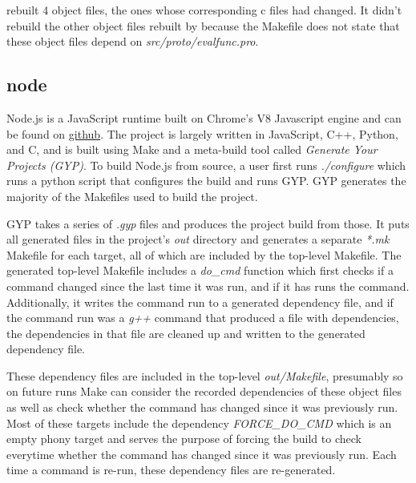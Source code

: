 \Make rebuilt 4 object files, the ones whose corresponding c files had changed.  It didn't rebuild the other object files rebuilt by \Rattle because the Makefile does not state that these object files
depend on \emph{src/proto/evalfunc.pro}.


\subsection{node}

Node.js is a JavaScript runtime built on Chrome's V8 Javascript engine and can be found on \href{``https://github.com/nodejs/node''}{github}.  The project is largely written in JavaScript, C++, Python, and C, and is built using Make and a meta-build tool called \emph{Generate Your Projects (GYP)}.  To build Node.js from source, a user first runs \emph{./configure} which runs a python script that configures the build and runs GYP.  GYP generates the majority of the Makefiles used to build the project.

GYP takes a series of \emph{.gyp} files and produces the project build from those.  It puts all generated files in the project's \emph{out} directory and generates a separate \emph{*.mk} Makefile for each target, all of which are included by the top-level Makefile.  The generated top-level Makefile includes a \emph{do\_cmd} function which first checks if a command changed since the last time it was run, and if it has runs the command.  Additionally, it writes the command run to a generated dependency file, and if the command run was a \emph{g++} command that produced a file with dependencies, the dependencies in that file are cleaned up and written to the generated dependency file.

These dependency files are included in the top-level \emph{out/Makefile}, presumably so on future runs Make can consider the recorded dependencies of these object files as well as check whether the command has changed since it was previously run.  Most of these targets include the dependency \emph{FORCE\_DO\_CMD} which is an empty phony target and serves the purpose of forcing the build to check everytime whether the command has changed since it was previously run. Each time a command is re-run, these dependency files are re-generated.


